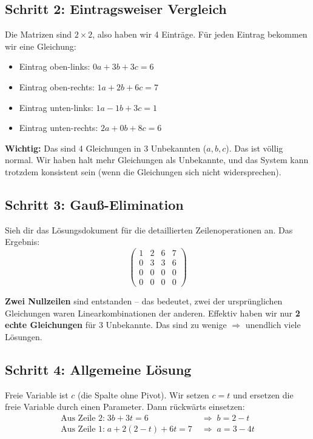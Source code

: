 \documentclass[a4paper,12pt]{article}
\begin{document}
\subsection*{Schritt 2: Eintragsweiser Vergleich}

Die Matrizen sind $2 \times 2$, also haben wir 4 Eintr\"age. F\"ur jeden Eintrag bekommen wir eine Gleichung:
\begin{itemize}[nosep]
    \item Eintrag oben-links: \; $0a + 3b + 3c = 6$
    \item Eintrag oben-rechts: \; $1a + 2b + 6c = 7$
    \item Eintrag unten-links: \; $1a - 1b + 3c = 1$
    \item Eintrag unten-rechts: \; $2a + 0b + 8c = 6$
\end{itemize}

\textbf{Wichtig:} Das sind 4 Gleichungen in 3 Unbekannten ($a, b, c$). Das ist v\"ollig normal. Wir haben halt mehr Gleichungen als Unbekannte, und das System kann trotzdem konsistent sein (wenn die Gleichungen sich nicht widersprechen).

\subsection*{Schritt 3: Gau\ss-Elimination}

Sieh dir das L\"osungsdokument f\"ur die detaillierten Zeilenoperationen an. Das Ergebnis:
\[
\left(\begin{array}{ccc|c}
1 & 2 & 6 & 7 \\
0 & 3 & 3 & 6 \\
0 & 0 & 0 & 0 \\
0 & 0 & 0 & 0
\end{array}\right)
\]

\textbf{Zwei Nullzeilen} sind entstanden -- das bedeutet, zwei der urspr\"unglichen Gleichungen waren Linearkombinationen der anderen. Effektiv haben wir nur \textbf{2 echte Gleichungen} f\"ur 3 Unbekannte. Das sind zu wenige $\Rightarrow$ unendlich viele L\"osungen.

\subsection*{Schritt 4: Allgemeine L\"osung}

Freie Variable ist $c$ (die Spalte ohne Pivot). Wir setzen $c = t$ und ersetzen die freie Variable durch einen Parameter. Dann r\"uckw\"arts einsetzen:
\begin{align*}
\text{Aus Zeile 2:} \; 3b + 3t = 6 \; &\Rightarrow \; b = 2 - t \\
\text{Aus Zeile 1:} \; a + 2(2-t) + 6t = 7 \; &\Rightarrow \; a = 3 - 4t
\end{align*}
\end{document}
